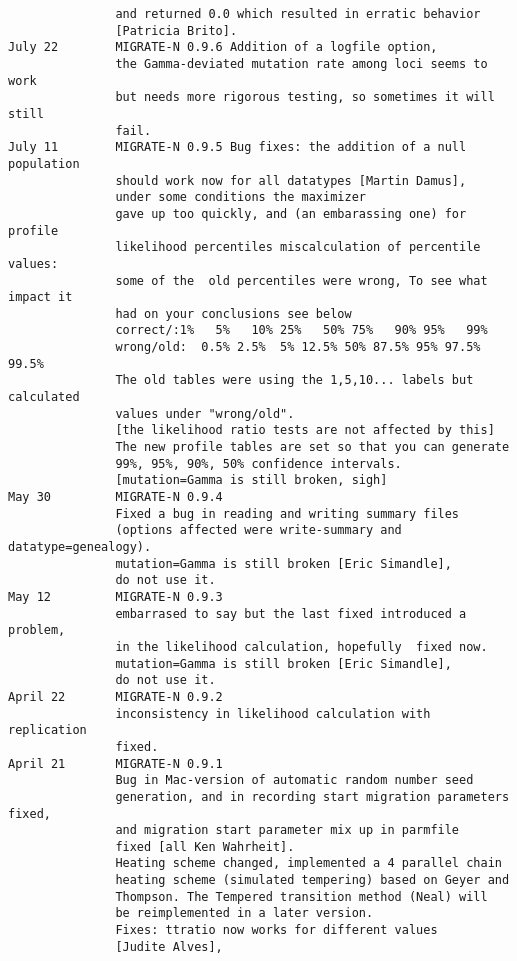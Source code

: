 \begin{small}
\begin{verbatim}
               and returned 0.0 which resulted in erratic behavior
               [Patricia Brito].
July 22        MIGRATE-N 0.9.6 Addition of a logfile option, 
               the Gamma-deviated mutation rate among loci seems to work
               but needs more rigorous testing, so sometimes it will still
               fail. 
July 11        MIGRATE-N 0.9.5 Bug fixes: the addition of a null population
               should work now for all datatypes [Martin Damus], 
               under some conditions the maximizer
               gave up too quickly, and (an embarassing one) for profile 
               likelihood percentiles miscalculation of percentile values: 
               some of the  old percentiles were wrong, To see what impact it
               had on your conclusions see below 
               correct/:1%   5%   10% 25%   50% 75%   90% 95%   99%
               wrong/old:  0.5% 2.5%  5% 12.5% 50% 87.5% 95% 97.5% 99.5%
               The old tables were using the 1,5,10... labels but calculated
               values under "wrong/old".
               [the likelihood ratio tests are not affected by this]
               The new profile tables are set so that you can generate
               99%, 95%, 90%, 50% confidence intervals. 
               [mutation=Gamma is still broken, sigh]  
May 30         MIGRATE-N 0.9.4
               Fixed a bug in reading and writing summary files
               (options affected were write-summary and datatype=genealogy).
               mutation=Gamma is still broken [Eric Simandle], 
               do not use it.
May 12         MIGRATE-N 0.9.3
               embarrased to say but the last fixed introduced a problem,
               in the likelihood calculation, hopefully  fixed now.
               mutation=Gamma is still broken [Eric Simandle], 
               do not use it.
April 22       MIGRATE-N 0.9.2
               inconsistency in likelihood calculation with replication
               fixed.
April 21       MIGRATE-N 0.9.1
               Bug in Mac-version of automatic random number seed
               generation, and in recording start migration parameters fixed,
               and migration start parameter mix up in parmfile 
               fixed [all Ken Wahrheit]. 
               Heating scheme changed, implemented a 4 parallel chain
               heating scheme (simulated tempering) based on Geyer and
               Thompson. The Tempered transition method (Neal) will 
               be reimplemented in a later version.
               Fixes: ttratio now works for different values 
               [Judite Alves],

\end{verbatim}
\end{small}
